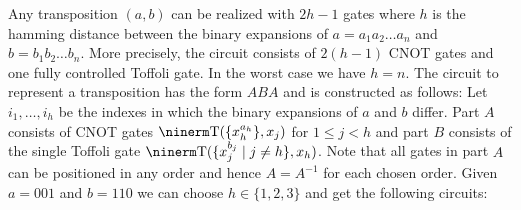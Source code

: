 \medskip{}\enspace Any transposition $(a,b)$ can be
realized with $2h-1$ gates where $h$ is the hamming distance between the binary
expansions of $a=a_1a_2\dots a_n$ and $b=b_1b_2\dots b_n$.  More precisely, the
circuit consists of $2(h-1)$ CNOT gates and one fully controlled Toffoli gate.
In the worst case we have $h=n$.  The circuit to represent a transposition has
the form $ABA$ and is constructed as follows: Let $i_1,\dots,i_h$ be the indexes
in which the binary expansions of $a$ and $b$ differ.  Part $A$ consists of CNOT
gates ${\rm T}(\{x_h^{a_h}\}, x_j)$ for $1\le j< h$ and part $B$ consists of the
single Toffoli gate ${\rm T}(\{x_j^{b_j}\mid j\neq h\}, x_h)$.  Note that all
gates in part $A$ can be positioned in any order and hence $A=A^{-1}$ for each
chosen order.  Given $a=001$ and $b=110$ we can choose $h \in \{1,2,3\}$ and get
the following circuits:

